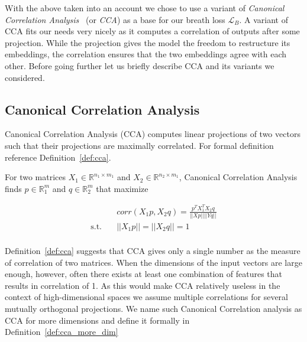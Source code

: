 With the above taken into an account we chose to use a variant of
\emph{Canonical Correlation Analysis}~\cite{hotelling1992relations} (or
\emph{CCA}) as a base for our breath loss $\mathcal{L}_B$. A variant of CCA fits
our needs very nicely as it computes a correlation of outputs after some
projection. While the projection gives the model the freedom to restructure its
embeddings, the correlation ensures that the two embeddings agree with each
other. Before going further let us briefly describe CCA and its variants we
considered.

\subsection{Canonical Correlation Analysis}

Canonical Correlation Analysis (CCA) computes linear projections of two vectors
such that their projections are maximally correlated. For formal definition
reference Definition~\ref{def:cca}.

\begin{defn}\label{def:cca}

  For two matrices $X_1 \in \mathbb{R}^{n_1 \times m_1}$ and $X_2 \in
  \mathbb{R}^{n_2 \times m_1}$, Canonical Correlation Analysis finds $p \in
  \mathbb{R}^m_1$ and $q \in \mathbb{R}^m_2$ that maximize

  \begin{equation}
    \begin{split}
      & corr(X_1p, X_2q) = \frac{p^TX_1^TX_2q}{||Xp|| ||Yq||} \\
      \text{s.t.}\quad &||X_1p|| = ||X_2q|| = 1 \\
    \end{split}
  \end{equation}


\end{defn}

Definition~\ref{def:cca} suggests that CCA gives only a single number as the
measure of correlation of two matrices. When the dimensions of the input vectors
are large enough, however, often there exists at least one combination of
features that results in correlation of 1. As this would make CCA relatively
useless in the context of high-dimensional spaces we assume multiple
correlations for several mutually orthogonal projections. We name such Canonical
Correlation analysis as CCA for more dimensions and define it formally in
Definition~\ref{def:cca_more_dim}

